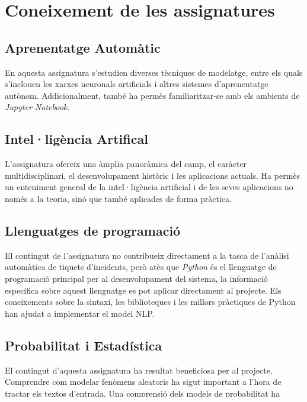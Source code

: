 \section{Coneixement de les assignatures}
\subsection*{Aprenentatge Automàtic}
En aquesta assignatura s'estudien diverses tècniques de modelatge, entre els quals s'inclouen les xarxes neuronals artificials i altres sistemes d'aprenentatge autònom. Addicionalment, també ha permès familiaritzar-se amb els ambients de \textit{Jupyter Notebook}.

\subsection*{Intel·ligència Artifical}
L'assignatura ofereix una àmplia panoràmica del camp, el caràcter multidisciplinari, el desenvolupament històric i les aplicacions actuals. Ha permès un enteniment general de la intel·ligència artificial i de les seves aplicacions no només a la teoria, sinó que també aplicades de forma pràctica.

\subsection*{Llenguatges de programació}
El contingut de l'assignatura no contribueix directament a la tasca de l'anàlisi automàtica de tiquets d'incidents, però atès que \textit{Python} és el llenguatge de programació principal per al desenvolupament del sistema, la informació específica sobre aquest llenguatge es pot aplicar directament al projecte. Els coneixements sobre la sintaxi, les biblioteques i les millors pràctiques de Python han ajudat a implementar el model NLP.

\subsection*{Probabilitat i Estadística}
El contingut d'aquesta assignatura ha resultat beneficiosa per al projecte. Comprendre com modelar fenòmens aleatoris ha sigut important a l'hora de tractar els textos d'entrada. Una comprensió dels models de probabilitat ha ajudat a analitzar correctament les dades i els resultats dels models.

